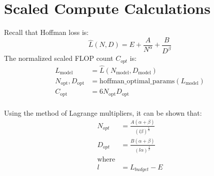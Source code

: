 \section{Scaled Compute Calculations}
\label{app:scaled_compute}

Recall that Hoffman loss is:
\begin{equation}
    \hat{L}(N, D) = E + \frac{A}{N^\alpha} + \frac{B}{D^\beta}
\end{equation}
The normalized scaled FLOP count $C_{opt}$ is:
\begin{align*}
    L_{\text{model}}        & = \hat{L}(N_{\text{model}}, D_{\text{model}})              \\
    N_{\text{opt}}, D_{\text{opt}} & = \text{hoffman\_optimal\_params}(L_{\text{model}}) \\
    C_{\text{opt}}          & = 6 N_{\text{opt}} D_{\text{opt}}                          \\
\end{align*}




Using the method of Lagrange multipliers, it can be shown that:
\begin{align*}
    N_{opt} &= \frac{A(\alpha + \beta)}{(l\beta)^\frac{1}{\alpha}} \\
    D_{opt} &= \frac{B(\alpha + \beta)}{(l\alpha)^\frac{1}{\beta}} \\ 
    \text{where} & \\
    l &= L_{budget} - E \\
\end{align*}